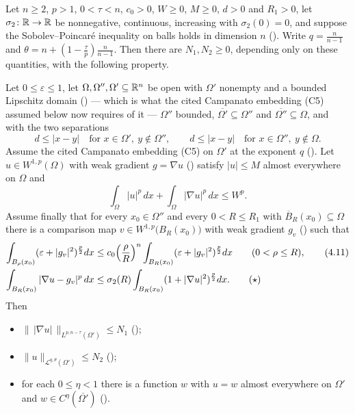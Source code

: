 \begin{helper}
Let $n\ge2$, $p>1$, $0<\tau<n$, $c_0>0$, $W\ge0$, $M\ge0$, $d>0$ and $R_1>0$,
let $\sigma_2\colon\mathbb{R}\to\mathbb{R}$ be nonnegative, continuous, increasing with
$\sigma_2(0)=0$, and suppose the Sobolev--Poincar\'e inequality on balls holds in
dimension $n$ ().  Write
$q=\frac n{n-1}$ and $\theta=n+(1-\frac\tau p)\frac n{n-1}$.  Then there are
$N_1,N_2\ge0$, depending only on these quantities, with the following property.

Let $0\le\varepsilon\le1$, let $\Omega,\Omega'',\Omega'\subseteq\mathbb{R}^n$ be open
with $\Omega'$ nonempty and a bounded Lipschitz domain
() --- which is what the cited Campanato
embedding (C5) assumed below now requires of it --- $\Omega''$ bounded,
$\overline{\Omega'}\subseteq\Omega''$ and $\overline{\Omega''}\subseteq\Omega$,
and with the two separations
\[
d\le|x-y|\quad\text{for }x\in\Omega',\ y\notin\Omega'' ,
\qquad
d\le|x-y|\quad\text{for }x\in\Omega'',\ y\notin\Omega .
\]
Assume the cited Campanato embedding (C5) on $\Omega'$ at the exponent $q$
().  Let $u\in W^{1,p}(\Omega)$ with weak
gradient $g=\nabla u$ () satisfy $|u|\le M$ almost everywhere
on $\Omega$ and
\[
\int_\Omega|u|^p\,dx+\int_\Omega|\nabla u|^p\,dx\le W^p .
\]
Assume finally that for every $x_0\in\Omega''$ and every $0<R\le R_1$ with
$\overline B_R(x_0)\subseteq\Omega$ there is a comparison map
$v\in W^{1,p}\bigl(B_R(x_0)\bigr)$ with weak gradient $g_v$
() such that
\begin{align}
\int_{B_\rho(x_0)}(\varepsilon+|g_v|^2)^{\frac p2}dx
&\le c_0\Bigl(\frac\rho R\Bigr)^{n}\int_{B_R(x_0)}(\varepsilon+|g_v|^2)^{\frac p2}dx
\qquad(0<\rho\le R),\tag{4.11}\\
\int_{B_R(x_0)}|\nabla u-g_v|^p\,dx
&\le\sigma_2(R)\int_{B_R(x_0)}(1+|\nabla u|^2)^{\frac p2}dx .\tag{$\star$}
\end{align}
Then
\begin{itemize}
\item[(i)] $\|\,|\nabla u|\,\|_{L^{p,n-\tau}(\Omega')}\le N_1$
  ();
\item[(ii)] $\|u\|_{\mathcal L^{q,\theta}(\Omega')}\le N_2$
  ();
\item[(iii)] for each $0\le\eta<1$ there is a function $w$ with $u=w$ almost
  everywhere on $\Omega'$ and $w\in C^\eta(\overline{\Omega'})$
  ().
\end{itemize}


\end{helper}
